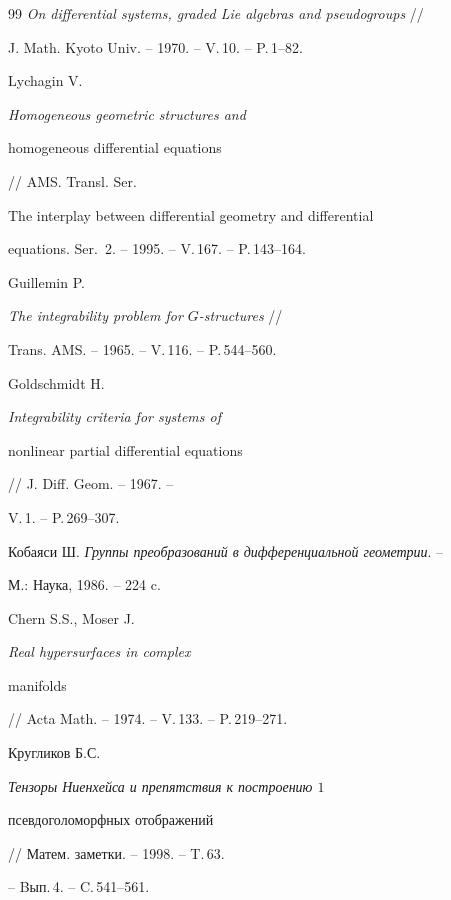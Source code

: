 \begin{thebibliography}{99}
{\it On differential systems, graded Lie algebras and pseudogroups} //


J. Math. Kyoto Univ. -- 1970. -- V.\,10. -- P.\,1--82.







Lychagin V. {\it Homogeneous geometric structures and


homogeneous differential equations} // AMS. Transl. Ser.


The interplay between differential geometry and differential


equations. Ser.~2. -- 1995. -- V.\,167. -- P.\,143--164.







Guillemin P.


{\it The integrability problem for $G$-structures} //


Trans. AMS. -- 1965. -- V.\,116. -- P.\,544--560.







Goldschmidt H. {\it Integrability criteria for systems of


nonlinear partial differential equations} // J. Diff. Geom. -- 1967. --


V.\,1. -- P.\,269--307.







Кобаяси Ш. {\em Группы преобразований в дифференциальной геометрии}. --


М.: Наука, 1986. -- 224 c.







Chern S.S., Moser J. {\it Real hypersurfaces in complex


manifolds} // Acta Math. -- 1974. -- V.\,133. -- P.\,219--271.







Кругликов Б.С. {\em Тензоры Ниенхейса и препятствия к построению $1$


псевдоголоморфных отображений} // Матем. заметки. -- 1998. -- T.\,63.


-- Bып.\,4. -- C.\,541--561.






\end{thebibliography}
